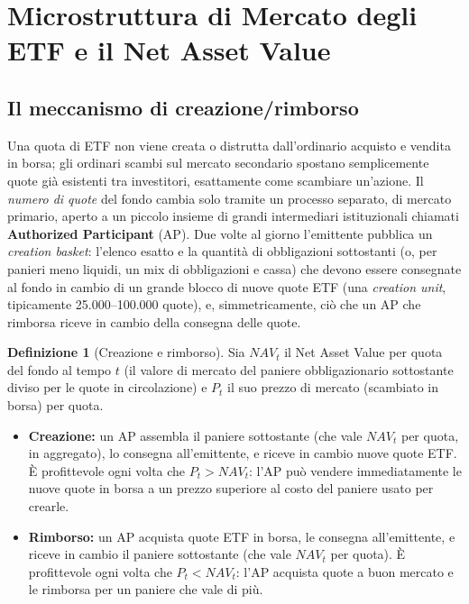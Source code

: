 \documentclass[11pt]{article}
\theoremstyle{definition}
\newtheorem{definition}[theorem]{Definizione}
\theoremstyle{remark}
\begin{document}
\section{Microstruttura di Mercato degli ETF e il Net Asset Value}
\label{sec:etf}

\subsection{Il meccanismo di creazione/rimborso}

Una quota di ETF non viene creata o distrutta dall'ordinario acquisto e vendita in borsa; gli ordinari scambi sul mercato secondario spostano semplicemente quote gi\`a esistenti tra investitori, esattamente come scambiare un'azione. Il \emph{numero di quote} del fondo cambia solo tramite un processo separato, di mercato primario, aperto a un piccolo insieme di grandi intermediari istituzionali chiamati \textbf{Authorized Participant} (AP). Due volte al giorno l'emittente pubblica un \emph{creation basket}: l'elenco esatto e la quantit\`a di obbligazioni sottostanti (o, per panieri meno liquidi, un mix di obbligazioni e cassa) che devono essere consegnate al fondo in cambio di un grande blocco di nuove quote ETF (una \emph{creation unit}, tipicamente 25.000--100.000 quote), e, simmetricamente, ci\`o che un AP che rimborsa riceve in cambio della consegna delle quote.

\begin{definition}[Creazione e rimborso]
Sia $NAV_t$ il Net Asset Value per quota del fondo al tempo $t$ (il valore di mercato del paniere obbligazionario sottostante diviso per le quote in circolazione) e $P_t$ il suo prezzo di mercato (scambiato in borsa) per quota.
\begin{itemize}
    \item \textbf{Creazione:} un AP assembla il paniere sottostante (che vale $NAV_t$ per quota, in aggregato), lo consegna all'emittente, e riceve in cambio nuove quote ETF. \`E profittevole ogni volta che $P_t>NAV_t$: l'AP pu\`o vendere immediatamente le nuove quote in borsa a un prezzo superiore al costo del paniere usato per crearle.
    \item \textbf{Rimborso:} un AP acquista quote ETF in borsa, le consegna all'emittente, e riceve in cambio il paniere sottostante (che vale $NAV_t$ per quota). \`E profittevole ogni volta che $P_t<NAV_t$: l'AP acquista quote a buon mercato e le rimborsa per un paniere che vale di pi\`u.
\end{itemize}
\end{definition}
\end{document}
